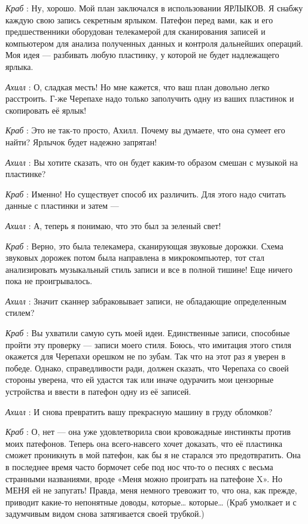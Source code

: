 \documentclass[../main.tex]{subfiles}
\begin{document}
\begin{dialogue}
\emph{Краб} : Ну, хорошо. Мой план заключался в использовании ЯРЛЫКОВ. Я снабжу каждую свою запись секретным ярлыком. Патефон перед вами, как и его предшественники оборудован телекамерой для сканирования записей и компьютером для анализа полученных данных и контроля дальнейших операций. Моя идея --- разбивать любую пластинку, у которой не будет надлежащего ярлыка.

\emph{Ахилл} : О, сладкая месть! Но мне кажется, что ваш план довольно легко расстроить. Г-же Черепахе надо только заполучить одну из ваших пластинок и скопировать её ярлык!

\emph{Краб} : Это не так-то просто, Ахилл. Почему вы думаете, что она сумеет его найти? Ярлычок будет надежно запрятан!

\emph{Ахилл} : Вы хотите сказать, что он будет каким-то образом смешан с музыкой на пластинке?

\emph{Краб} : Именно! Но существует способ их различить. Для этого надо считать данные с пластинки и затем ---

\emph{Ахилл} : А, теперь я понимаю, что это был за зеленый свет!

\emph{Краб} : Верно, это была телекамера, сканирующая звуковые дорожки. Схема звуковых дорожек потом была направлена в микрокомпьютер, тот стал анализировать музыкальный стиль записи и все в полной тишине! Еще ничего пока не проигрывалось.

\emph{Ахилл} : Значит сканнер забраковывает записи, не обладающие определенным стилем?

\emph{Краб} : Вы ухватили самую суть моей идеи. Единственные записи, способные пройти эту проверку --- записи моего стиля. Боюсь, что имитация этого стиля окажется для Черепахи орешком не по зубам. Так что на этот раз я уверен в победе. Однако, справедливости ради, должен сказать, что Черепаха со своей стороны уверена, что ей удастся так или иначе одурачить мои цензорные устройства и ввести в патефон одну из её записей.

\emph{Ахилл} : И снова превратить вашу прекрасную машину в груду обломков?

\emph{Краб} : О, нет --- она уже удовлетворила свои кровожадные инстинкты против моих патефонов. Теперь она всего-навсего хочет доказать, что её пластинка сможет проникнуть в мой патефон, как бы я не старался это предотвратить. Она в последнее время часто бормочет себе под нос что-то о песнях с весьма странными названиями, вроде «Меня можно проиграть на патефоне X». Но МЕНЯ ей не запугать! Правда, меня немного тревожит то, что она, как прежде, приводит какие-то непонятные доводы, которые\ldots{} которые\ldots{} (Краб умолкает и с задумчивым видом снова затягивается своей трубкой.)


\end{dialogue}
\end{document}
